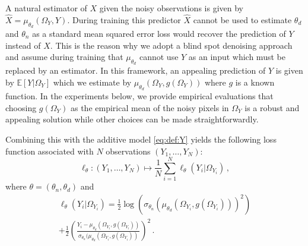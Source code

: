 \documentclass{article}
\begin{document}
A natural estimator of $X$ given the noisy observations is given by $\widehat X = \mu_{\theta_d}(\Omega_Y,Y)$. During training this predictor $\widehat X$ cannot be used to estimate $\theta_d$ and $\theta_n$ as  a standard mean squared error loss would recover the prediction of $Y$ instead of $X$. This is the reason why we adopt a blind spot denoising approach and assume during training that $\mu_{\theta_d}$ cannot use $Y$ as an input which must be replaced by an estimator. In this framework, an appealing prediction of $Y$ is given by $\mathbb{E}[Y|\Omega_Y]$ which we estimate by $\mu_{\theta_d}(\Omega_Y,g(\Omega_Y))$ where $g$ is a known function. %
 In the experiments below, we provide empirical evaluations that choosing $g(\Omega_Y)$ as the empirical mean of the noisy pixels in $\Omega_Y$ is a robust and appealing solution while other choices can be made straightforwardly.

Combining this with the additive model  \eqref{eq:def:Y} yields the following loss function associated with $N$ observations $(Y_1,\ldots,Y_N)$:
$$
\ell_{\theta}: (Y_1,\ldots,Y_N) \mapsto \frac{1}{N}\sum_{i=1}^N \ell_{\theta}(Y_i|\Omega_{Y_i})\,,
$$
where $\theta = (\theta_n,\theta_d)$ and
\begin{multline*}
\ell_{\theta}(Y_i|\Omega_{Y_i}) = \frac{1}{2}\log(\sigma_{\theta_n}( \mu_{\theta_d}(\Omega_{Y_i},g(\Omega_{Y_i})))^2) \\
+\frac{1}{2}\left(\frac{Y_i-\mu_{\theta_d}(\Omega_{Y_i},g(\Omega_{Y_i}))}{\sigma_{\theta_n}(\mu_{\theta_d}(\Omega_{Y_i},g(\Omega_{Y_i}))}\right)^2\,. %
\end{multline*}
\end{document}

